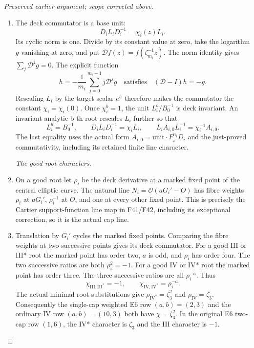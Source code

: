 \begin{proof}[Preserved earlier argument; scope corrected above]
\begin{enumerate}[label=\arabic*.]
\item The deck commutator is a base unit:
\[
                      D_iL_iD_i^{-1}=\chi_i(z)L_i.
\]
Its cyclic norm is one. Divide by its constant value at zero, take
the logarithm \(g\) vanishing at zero, and put
\(\mathcal D f(z)=f(\zeta_{m_i}^{-1}z)\). The norm identity
gives \(\sum_j\mathcal D^jg=0\). The explicit function
\[
 h=-\frac1{m_i}\sum_{j=0}^{m_i-1}j\mathcal D^jg
 \quad\text{satisfies}\quad (\mathcal D-I)h=-g.
\]
Rescaling \(L_i\) by the target scalar \(e^h\) therefore makes
the commutator the constant
\(\chi_i=\chi_i(0)\). Once \(\chi_i^b=1\), the unit
\(L_i^b/B_0^{-1}\) is deck invariant. An invariant analytic b-th
root rescales \(L_i\) further so that
\[
 L_i^b=B_0^{-1},\qquad
 D_iL_iD_i^{-1}=\chi_i L_i,
 \qquad L_iA_{i,0}L_i^{-1}=\chi_i^{-1}A_{i,0}.          \tag{P3K.35.9}
\]
The last equality uses the actual form \(A_{i,0}=\text{unit}\cdot
F_i^{n_i}D_i\) and the just-proved commutativity, including its
retained finite line character.

\par\smallskip\noindent\textit{The good-root characters.}\enspace

\item On a good root let \(\rho_i\) be the deck derivative at a marked
fixed point of the central elliptic curve. The natural line
\(N_i=\mathcal O(aG_i'-O)\) has fibre weights \(\rho_i\) at
\(aG_i'\), \(\rho_i^{-1}\) at \(O\), and one at every other
fixed point. This is precisely the Cartier support-function line
map in F41/F42, including its exceptional correction, so it is
the actual cap line.

\item Translation by \(G_i'\) cycles the marked fixed points. Comparing
the fibre weights at two successive points gives its deck
commutator. For a good III or III* root the marked point has order
two, \(a\) is odd, and \(\rho_i\) has order four. The two successive
ratios are both \(\rho_i^2=-1\). For a good IV or IV* root the
marked point has order three. The three successive ratios are
all \(\rho_i^{-a}\). Thus
\[
 \chi_{\mathrm{III},\mathrm{III}^*}=-1,\qquad
 \chi_{\mathrm{IV},\mathrm{IV}^*}=\rho_i^{-a}.           \tag{P3K.35.10}
\]
The actual minimal-root substitutions give
\(\rho_{\mathrm{IV}^*}=\zeta_3^2\) and
\(\rho_{\mathrm{IV}}=\zeta_3\). Consequently the single-cap
weighted E6 row \((a,b)=(2,3)\) and the ordinary IV row
\((a,b)=(10,3)\) both have \(\chi=\zeta_3^2\).
In the original E6 two-cap row \((1,6)\), the IV* character is
\(\zeta_3\) and the III character is \(-1\).


\end{enumerate}
\end{proof}
